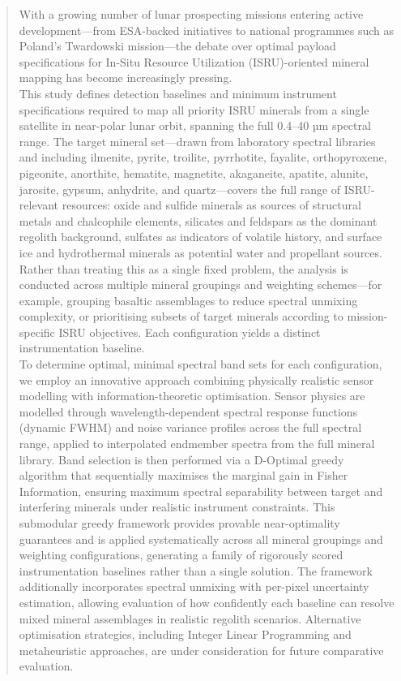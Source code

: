 \documentclass[12pt]{article}
\begin{document}
\begin{abstract}
With a growing number of lunar prospecting missions entering active development—from ESA-backed initiatives to national programmes such as Poland's Twardowski mission—the debate over optimal payload specifications for In-Situ Resource Utilization (ISRU)-oriented mineral mapping has become increasingly pressing.\\

This study defines detection baselines and minimum instrument specifications required to map all priority ISRU minerals from a single satellite in near-polar lunar orbit, spanning the full 0.4–40 µm spectral range. The target mineral set—drawn from laboratory spectral libraries and including ilmenite, pyrite, troilite, pyrrhotite, fayalite, orthopyroxene, pigeonite, anorthite, hematite, magnetite, akaganeite, apatite, alunite, jarosite, gypsum, anhydrite, and quartz—covers the full range of ISRU-relevant resources: oxide and sulfide minerals as sources of structural metals and chalcophile elements, silicates and feldspars as the dominant regolith background, sulfates as indicators of volatile history, and surface ice and hydrothermal minerals as potential water and propellant sources. Rather than treating this as a single fixed problem, the analysis is conducted across multiple mineral groupings and weighting schemes—for example, grouping basaltic assemblages to reduce spectral unmixing complexity, or prioritising subsets of target minerals according to mission-specific ISRU objectives. Each configuration yields a distinct instrumentation baseline.\\

To determine optimal, minimal spectral band sets for each configuration, we employ an innovative approach combining physically realistic sensor modelling with information-theoretic optimisation. Sensor physics are modelled through wavelength-dependent spectral response functions (dynamic FWHM) and noise variance profiles across the full spectral range, applied to interpolated endmember spectra from the full mineral library. Band selection is then performed via a D-Optimal greedy algorithm that sequentially maximises the marginal gain in Fisher Information, ensuring maximum spectral separability between target and interfering minerals under realistic instrument constraints. This submodular greedy framework provides provable near-optimality guarantees and is applied systematically across all mineral groupings and weighting configurations, generating a family of rigorously scored instrumentation baselines rather than a single solution. The framework additionally incorporates spectral unmixing with per-pixel uncertainty estimation, allowing evaluation of how confidently each baseline can resolve mixed mineral assemblages in realistic regolith scenarios. Alternative optimisation strategies, including Integer Linear Programming and metaheuristic approaches, are under consideration for future comparative evaluation.\\


\end{abstract}
\end{document}
